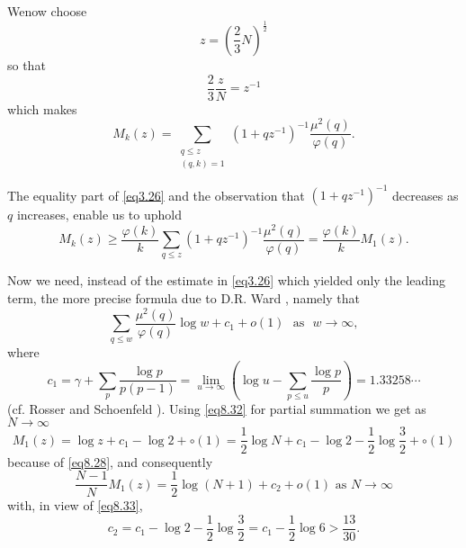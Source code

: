 We\pageoriginale now choose 
\begin{equation*}
z = (\frac{2}{3}N)^{\frac{1}{2}}\tag{8.28}\label{eq8.28}
\end{equation*}
so that 
\begin{equation*}
\frac{2}{3} \frac{z}{N}= z^{-1}\tag{8.29}\label{eq8.29}
\end{equation*}
which makes 
\begin{equation*}
M_k(z) = \sum_{\substack{q \leq z \\ {(q, k)=1}}} (1+ qz^{-1})^{-1}
\frac{\mu^2(q)}{\varphi(q)}.\tag{8.30}\label{eq8.30} 
\end{equation*}

The equality part of \eqref{eq3.26} and the observation that
$(1+qz^{-1})^{-1}$ decreases as $q$ increases, enable us to uphold  
\begin{equation*}
M_k(z) \geq \frac{\varphi(k)}{k} \sum_{q \leq z}(1+qz^{-1})^{-1}
\frac{\mu^2(q)}{\varphi(q)} = \frac{\varphi(k)}{k}
M_1(z).\tag{8.31} \label{eq8.31} 
\end{equation*}

Now we need, instead of the estimate in \eqref{eq3.26} which yielded only
the leading term, the more precise formula due to D.R. Ward \cite{key1},
namely that  
\begin{equation*}
\sum_{q \leq w}\frac{\mu^2(q)}{\varphi(q)} \log w + c_1+o (1) \text{~
  as~ } w \to \infty,\tag{8.32}\label{eq8.32} 
\end{equation*}
where 
\begin{equation*}
c_1 = \gamma + \sum_p \frac{\log p}{p(p-1)} =\lim_{u \to \infty} (\log u -
\sum_{p \leq u} \frac{\log p}{p}) = 1.33258 \cdots
\tag{8.33}\label{eq8.33} 
\end{equation*}
(cf. Rosser and Schoenfeld \cite{key1}). Using \eqref{eq8.32} for
partial summation we get as $N \to \infty$ 
\begin{equation*}
M_1(z) = \log z+c_1 - \log 2+ \circ (1)=\frac{1}{2} \log N+ c_1 - \log
2-\frac{1}{2} \log\frac{3}{2}+ \circ (1)\tag{8.34}\label{eq8.34} 
\end{equation*}
because of \eqref{eq8.28}, and consequently
\begin{equation*}
\frac{N-1}{N}M_1(z) = \frac{1}{2} \log (N+1) + c_2 + o(1) \text{ as }
N \to \infty \tag{8.35}\label{eq8.35} 
\end{equation*}
with, in view of \eqref{eq8.33},
\begin{equation*}
c_2 = c_1- \log 2-\frac{1}{2} \log \frac{3}{2} = c_1 -\frac{1}{2}
\log 6 > \frac{13}{30}.\tag{8.36}\label{eq8.36}  
\end{equation*}\pageoriginale

